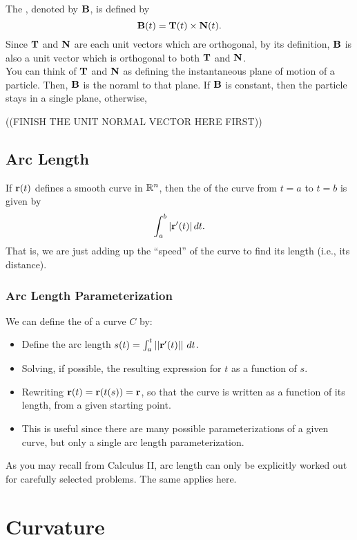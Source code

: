 The , denoted by \(\mathbf{B}\), is defined by
\[
    \mathbf{B}(t) = \mathbf{T}(t) \times \mathbf{N}(t).
\]
Since \(\mathbf{T}\) and \(\mathbf{N}\) are each unit vectors which are orthogonal, by its definition, \(\mathbf{B}\) is also a unit vector which is orthogonal to both \(\mathbf{T}\) and \(\mathbf{N}\). \\

You can think of \(\mathbf{T}\) and \(\mathbf{N}\) as defining the instantaneous plane of motion of a particle. Then, \(\mathbf{B}\) is the noraml to that plane. If \(\mathbf{B}\) is constant, then the particle stays in a single plane, otherwise, 


((FINISH THE UNIT NORMAL VECTOR HERE FIRST))


\subsection{Arc Length}

If \(\mathbf{r}(t)\) defines a smooth curve in \(\mathbb{R}^{n}\), then the  of the curve from \(t = a\) to \(t = b\) is given by
\[
    \int_{a}^{b} |\mathbf{r}'(t)| \, dt.
\]
That is, we are just adding up the ``speed'' of the curve to find its length (i.e., its distance).

\subsubsection{Arc Length Parameterization} 

We can define the  of a curve \(C\) by:
\begin{itemize}
    \item Define the arc length \(s(t) = \int_{a}^{t}||\mathbf{r}'(t)|| \ dt\).
    \item Solving, if possible, the resulting expression for \(t\) as a function of \(s\).
    \item Rewriting \(\mathbf{r}(t) = \mathbf{r}(t(s)) = \mathbf{r}\), so that the curve is written as a function of its length, from a given starting point.
    \item This is useful since there are many possible parameterizations of a given curve, but only a single arc length parameterization.
\end{itemize}
As you may recall from Calculus II, arc length can only be explicitly worked out for carefully selected problems. The same applies here.

\section{Curvature}

